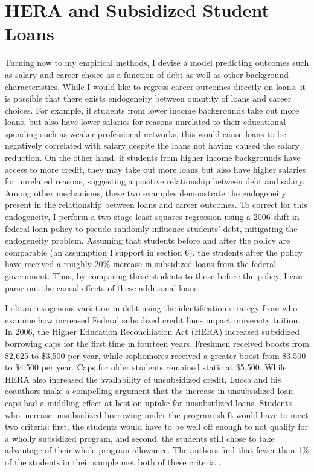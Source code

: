 \documentclass[12pt]{article}
\begin{document}
	\section{HERA and Subsidized Student Loans}
	
	Turning now to my empirical methods, I devise a model predicting outcomes such as salary and career choice as a function of debt as well as other background characteristics. While I would like to regress career outcomes directly on loans, it is possible that there exists endogeneity between quantity of loans and career choices. For example, if students from lower income backgrounds take out more loans, but also have lower salaries for reasons unrelated to their educational spending such as weaker professional networks, this would cause loans to be negatively correlated with salary despite the loans not having caused the salary reduction. On the other hand, if students from higher income backgrounds have access to more credit, they may take out more loans but also have higher salaries for unrelated reasons, suggesting a positive relationship between debt and salary. Among other mechanisms, these two examples demonstrate the endogeneity present in the relationship between loans and career outcomes. To correct for this endogeneity, I perform a two-stage least squares regression using a 2006 shift in federal loan policy to pseudo-randomly influence students' debt, mitigating the endogeneity problem. Assuming that students before and after the policy are comparable (an assumption I support in section 6), the students after the policy have received a roughly 20\% increase in subsidized loans from the federal government. Thus, by comparing these students to those before the policy, I can parse out the causal effects of these additional loans.
	
	I obtain exogenous variation in debt using the identification strategy from \textcite{lucca2018} who examine how increased Federal subsidized credit lines impact university tuition. In 2006, the Higher Education Reconciliation Act (HERA) increased subsidized borrowing caps for the first time in fourteen years. Freshmen received boosts from \$2,625 to \$3,500 per year, while sophomores received a greater boost from \$3,500 to \$4,500 per year. Caps for older students remained static at \$5,500. While HERA also increased the availability of unsubsidized credit, Lucca and his coauthors make a compelling argument that the increase in unsubsidized loan caps had a middling effect at best on uptake for unsubsidized loans. Students who increase unsubsidized borrowing under the program shift would have to meet two criteria: first, the students would have to be well off enough to not qualify for a wholly subsidized program, and second, the students still chose to take advantage of their whole program allowance. The authors find that fewer than 1\% of the students in their sample met both of these criteria \parencite[p. 434]{lucca2018}.
	
\end{document}

